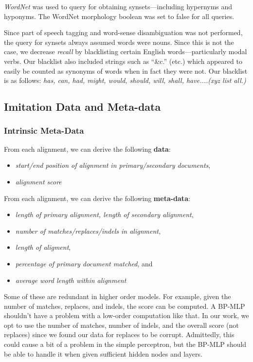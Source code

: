 \textit{WordNet} \cite{wordnet_1998} was used to query for obtaining synsets---including hypernyms and hyponyms. The WordNet morphology boolean was set to false for all queries. 

Since part of speech tagging and word-sense disambiguation was not performed, the query for synsets always assumed words were nouns. Since this is not the case, we decrease \textit{recall} by blacklisting certain English words---particularly modal verbs. Our blacklist also included strings such as ``\&c.'' (etc.) which appeared to easily be counted as synonyms of words when in fact they were not. Our blacklist is as follows: \textit{has, can, had, might, would, should, will, shall, have....(xyz list all.)}


\subsection{Imitation Data and Meta-data}

\subsubsection{Intrinsic Meta-Data}
From each alignment, we can derive the following \textbf{data}:
	\begin{itemize}
		\item \textit{start/end position of alignment in primary/secondary documents},
		\item \textit{alignment score}
	\end{itemize}

From each alignment, we can derive the following \textbf{meta-data}:
	\begin{itemize}
		\item \textit{length of primary alignment, length of secondary alignment},
		\item \textit{number of matches/replaces/indels in alignment},
		\item \textit{length of aligment},
		\item \textit{percentage of primary document matched}, and
		\item \textit{average word length within alignment}
	\end{itemize}

Some of these are redundant in higher order models. For example, given the number of matches, replaces, and indels, the score can be computed. A BP-MLP shouldn't have a problem with a low-order computation like that. In our work, we opt to use the number of matches, number of indels, and the overall score (not replaces) since we found our data for replaces to be corrupt. Admittedly, this could cause a bit of a problem in the simple perceptron, but the BP-MLP should be able to handle it when given sufficient hidden nodes and layers.

